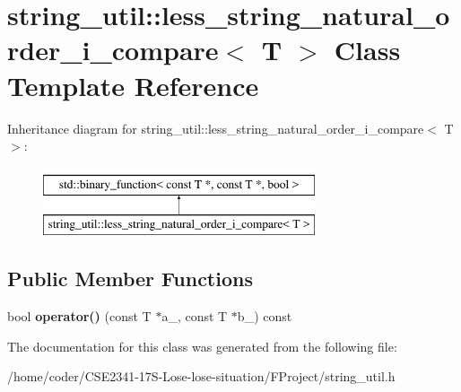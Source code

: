 \section{string\+\_\+util\+:\+:less\+\_\+string\+\_\+natural\+\_\+order\+\_\+i\+\_\+compare$<$ T $>$ Class Template Reference}
\label{classstring__util_1_1less__string__natural__order__i__compare}
Inheritance diagram for string\+\_\+util\+:\+:less\+\_\+string\+\_\+natural\+\_\+order\+\_\+i\+\_\+compare$<$ T $>$\+:\begin{figure}[H]
\begin{center}
\leavevmode
\includegraphics[height=2.000000cm]{classstring__util_1_1less__string__natural__order__i__compare}
\end{center}
\end{figure}
\subsection*{Public Member Functions}
\begin{DoxyCompactItemize}
\item 
bool {\bfseries operator()} (const T $\ast$a\+\_\+, const T $\ast$b\+\_\+) const \label{classstring__util_1_1less__string__natural__order__i__compare_a213ba84bcb81fa025951194acbdb899c}

\end{DoxyCompactItemize}


The documentation for this class was generated from the following file\+:\begin{DoxyCompactItemize}
\item 
/home/coder/\+C\+S\+E2341-\/17\+S-\/\+Lose-\/lose-\/situation/\+F\+Project/string\+\_\+util.\+h\end{DoxyCompactItemize}
